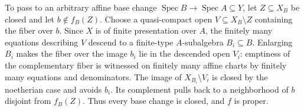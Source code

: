 To pass to an arbitrary affine base change $\operatorname{Spec}B\to\operatorname{Spec}A\subseteq Y$, let $Z\subseteq X_B$ be closed and let $b\notin f_B(Z)$. Choose a quasi-compact open $V\subseteq X_B\setminus Z$ containing the fiber over $b$. Since $X$ is of finite presentation over $A$, the finitely many equations describing $V$ descend to a finite-type $A$-subalgebra $B_i\subseteq B$. Enlarging $B_i$ makes the fiber over the image $b_i$ lie in the descended open $V_i$: emptiness of the complementary fiber is witnessed on finitely many affine charts by finitely many equations and denominators. The image of $X_{B_i}\setminus V_i$ is closed by the noetherian case and avoids $b_i$. Its complement pulls back to a neighborhood of $b$ disjoint from $f_B(Z)$. Thus every base change is closed, and $f$ is proper.
